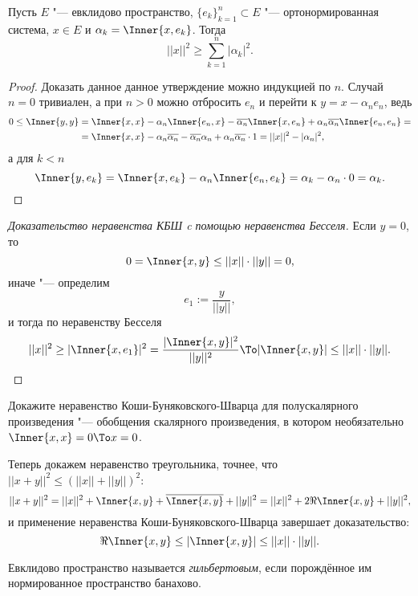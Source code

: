\documentclass[main]{subfiles}
\begin{document}
\begin{proposition}
  Пусть \( E \) "--- евклидово пространство,
  \( {\{ e_k \}}_{k = 1}^n \subset E \) "--- ортонормированная система,
  \( x \in E \) и \( \alpha_k = \Inner{x, e_k} \). Тогда
  \[ ||x||^2 \ge \sum_{k = 1}^{n} |\alpha_k|^2. \]
\end{proposition}
\begin{proof}
  Доказать данное данное утверждение можно индукцией по \( n \).
  Случай \( n = 0 \) тривиален, а при \( n > 0 \) можно
  отбросить \( e_n \) и перейти к \( y = x - \alpha_n e_n \),
  ведь 
  \begin{align}
    0 \le \Inner{y, y} &=
    \Inner{x, x} - \alpha_n \Inner{e_n, x}
    - \overline{\alpha_n} \Inner{x, e_n}
    + \alpha_n \overline{\alpha_n} \Inner{e_n, e_n} = \\
    &= \Inner{x, x} - \alpha_n \overline{\alpha_n}
    - \overline{\alpha_n} \alpha_n +
    \alpha_n \overline{\alpha_n} \cdot 1 =
    ||x||^2 - |\alpha_n|^2,
  \end{align}
  а для \( k < n \)
  \[
    \Inner{y, e_k} =
    \Inner{x, e_k} - \alpha_n \Inner{e_n, e_k} =
    \alpha_k - \alpha_n \cdot 0 =
    \alpha_k. \qedhere
  \]
\end{proof}

\begin{proof}[Доказательство неравенства КБШ
  c помощью неравенства Бесселя]
  Если \( y = 0 \), то
  \[ 0 = \Inner{x, y} \le ||x|| \cdot ||y|| = 0, \]
  иначе "--- определим
  \[
    e_1 := \frac{y}{||y||},
  \]
  и тогда по неравенству Бесселя
  \[
    ||x||^2 \ge |\Inner{x, e_1}|^2 =
    \frac{|\Inner{x, y}|^2}{||y||^2} \To
    |\Inner{x, y}| \le ||x|| \cdot ||y||. \qedhere
  \]
\end{proof}

\begin{exercise}
  Докажите неравенство Коши-Буняковского-Шварца
  для полускалярного произведения "---
  обобщения скалярного произведения, в котором
  необязательно \( \Inner{x, x} = 0 \To x = 0 \).
\end{exercise}

Теперь докажем неравенство треугольника, точнее, что
\( ||x + y||^2 \le {(||x|| + ||y||)}^2 \):
\[
  ||x + y||^2 =
  ||x||^2 + \Inner{x, y} + \overline{\Inner{x, y}} + ||y||^2 =
  ||x||^2 + 2 \Re \Inner{x, y} + ||y||^2,
\]
и применение неравенства Коши-Буняковского-Шварца
завершает доказательство:
\[
  \Re \Inner{x, y} \le |\Inner{x, y}| \le ||x|| \cdot ||y||.
\]

\begin{definition}
  Евклидово пространство называется \emph{гильбертовым},
  если порождённое им нормированное пространство
  банахово.
\end{definition}
\end{document}
